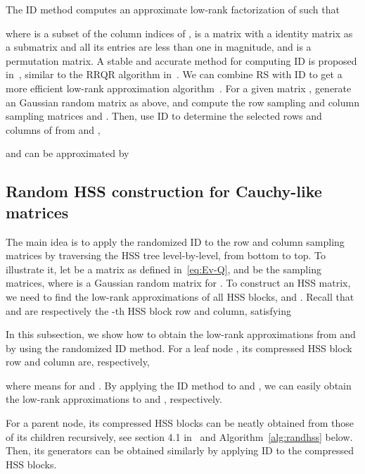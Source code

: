 \documentclass[times]{nlaauth}
\newcounter{algorithm}
\begin{document}
The ID method computes an approximate low-rank factorization of  such that

where  is a subset of the column indices of ,  is a  matrix with
a  identity matrix as a submatrix and all its entries are less than one in
magnitude, and  is a permutation matrix.
A stable and accurate method for computing ID is proposed in~\cite{Cheng-Random}, similar
to the RRQR algorithm in~\cite{Gu-RRQR}.
We can combine RS with ID to get a more efficient low-rank approximation algorithm~\cite{Martinsson-PNAS07}.
For a given  matrix , generate an  Gaussian random matrix  as above, and compute
the row sampling and column sampling matrices  and .
Then, use ID to determine the  selected rows and columns of  from  and ,

and  can be approximated by


\subsection{Random HSS construction for Cauchy-like matrices}
\label{sec:rhss-cauchy}

The main idea is to apply the randomized ID to the row and column sampling matrices by
traversing the HSS tree level-by-level, from bottom to top.
To illustrate it, let  be a matrix as defined in~\eqref{eq:Ev-Q},  and 
be the sampling matrices, where  is a Gaussian random matrix for .
To construct an HSS matrix, we need to find the low-rank approximations of all HSS blocks,  and
. Recall that  and  are respectively the -th HSS block row and column,
satisfying


In this subsection, we show how to obtain the low-rank approximations from  and  by using the randomized ID method.
For a leaf node , its compressed HSS block row and column are, respectively,

where  means  for  and .
By applying the ID method to  and , we can easily obtain the low-rank approximations to  and
, respectively.

For a parent node, its compressed HSS blocks can be neatly obtained from those of its
children recursively, see section 4.1 in~\cite{rand-hss} and Algorithm~\ref{alg:randhss} below.
Then, its generators can be obtained similarly by applying ID to the compressed HSS blocks.
\end{document}

